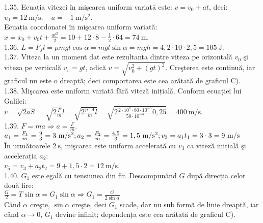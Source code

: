 1.35. Ecuația vitezei în mişcarea uniform variată este: $v=v_{0}+a t$, deci:\\ $v_{0}=12 \mathrm{~m} / \mathrm{s}; \quad a=-1 \mathrm{~m} / \mathrm{s}^{2}$.\\ Ecuația coordonatei în mişcarea uniform variată:\\ $x=x_{0}+v_{0} t+\frac{a t^{2}}{2}=10+12 \cdot 8-\frac{1}{2} \cdot 64=74 \mathrm{~m}$.\\

1.36. $L=F_{f} l=\mu m g l \cos \alpha=m g l \sin \alpha=m g h=4,2 \cdot 10 \cdot 2,5=105 \mathrm{~J}$.\\

1.37. Viteza la un moment dat este rezultanta dintre viteza pe orizontală $v_{0}$ şi viteza pe verticală $v_{v}=g t$, adică $v=\sqrt{v_{0}^{2}+(g t)^{2}}$. Creşterea este continuă, iar graficul nu este o dreaptă; deci comportarea este cea arătată de graficul C).\\

1.38. Mişcarea este uniform variată fără viteză inițială. Conform ecuației lui Galilei:\\ $v=\sqrt{2 a S}=\sqrt{2 \frac{F}{m}} l=\sqrt{2 \frac{p \cdot A}{m} l}=\sqrt{2 \frac{2 \cdot 10^{8} \cdot 80 \cdot 10^{-6}}{50 \cdot 10^{-3}} 0,25}=400 \mathrm{~m} / \mathrm{s}$.\\

1.39. $F=m a \Rightarrow a=\frac{F}{m}$.\\ $a_{1}=\frac{F_{1}}{m}=\frac{9}{3}=3 \mathrm{~m} / \mathrm{s}^{2};\\ a_{2}=\frac{F_{2}}{m}=\frac{4,5}{3}=1,5 \mathrm{~m} / \mathrm{s}^{2};\\ v_{3}=a_{1} t_{1}=3 \cdot 3=9 \mathrm{~m} / \mathrm{s}$\\ În următoarele $2 \mathrm{~s}$, mişcarea este uniform accelerată cu $v_{3}$ ca viteză inițială şi accelerația $a_{2}$:\\ $v_{5}=v_{3}+a_{2} t_{2}=9+1,5 \cdot 2=12 \mathrm{~m} / \mathrm{s}$.\\

1.40. $G_{1}$ este egală cu tensiunea din fir. Descompunând $G$ după direcția celor două fire:\\ $\frac{G}{2}=T \sin \alpha =G_{1} \sin \alpha \Rightarrow G_{1}=\frac{G}{2 \sin \alpha}$\\ Când $\alpha$ creşte, $\sin \alpha$ creşte, deci $G_{1}$ scade, dar nu sub formă de linie dreaptă, iar când $\alpha \rightarrow 0$, $G_{1}$ devine infinit; dependența este cea arătată de graficul C).\\

